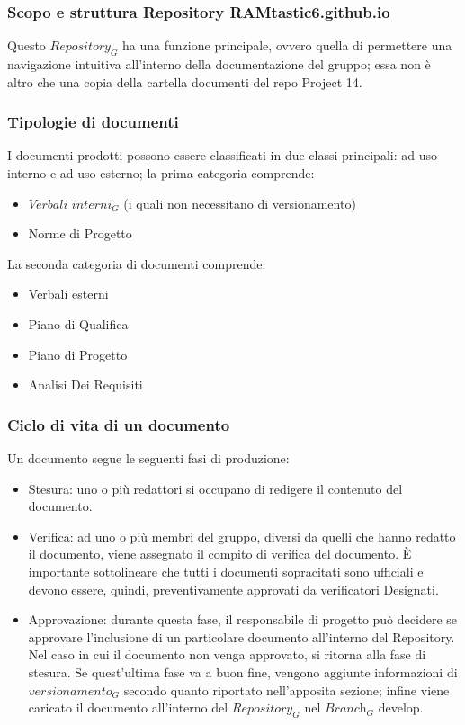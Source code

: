 \subsubsection{Scopo e struttura Repository RAMtastic6.github.io}
Questo $\textit{Repository}_G$ ha una funzione principale, ovvero quella di permettere una navigazione intuitiva all'interno della documentazione del gruppo; essa non è altro che una copia della cartella documenti del repo Project 14.

\subsubsection{Tipologie di documenti}
I documenti prodotti possono essere classificati in due classi principali: ad uso interno e ad uso esterno; la prima categoria comprende:
\begin{itemize}
    \item $\textit{Verbali interni}_G$ (i quali non necessitano di versionamento)
    \item Norme di Progetto
\end{itemize}
La seconda categoria di documenti comprende:
\begin{itemize}
    \item Verbali esterni
    \item Piano di Qualifica
    \item Piano di Progetto
    \item Analisi Dei Requisiti
\end{itemize}
\subsubsection{Ciclo di vita di un documento}
Un documento segue le seguenti fasi di produzione:
\begin{itemize}
    \item Stesura: uno o più redattori si occupano di redigere il contenuto del documento.
    \item Verifica: ad uno o più membri del gruppo, diversi da quelli che hanno redatto il documento, viene assegnato il compito di verifica del documento.
È importante sottolineare che tutti i documenti sopracitati sono ufficiali e devono essere, quindi, preventivamente approvati da verificatori Designati.
    \item Approvazione: durante questa fase, il responsabile di progetto può decidere se approvare l'inclusione di un particolare documento all'interno del Repository. Nel caso in cui il documento non venga approvato, si ritorna alla fase di stesura.
    Se quest'ultima fase va a buon fine, vengono aggiunte informazioni di $\textit{versionamento}_G$ secondo quanto riportato nell'apposita sezione; infine viene caricato il documento all'interno del $\textit{Repository}_G$ nel $\textit{Branch}_G$ develop.
\end{itemize}
